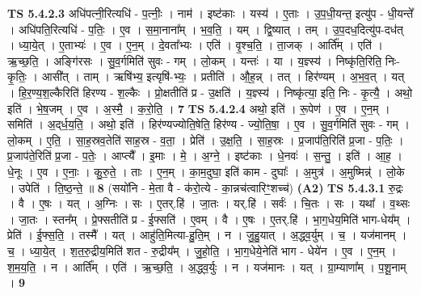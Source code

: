 \documentclass[17pt]{extarticle}
\begin{document}
                  \newline
                                \textbf{ TS 5.4.2.3} \newline
                  अधि॑पत्नी॒रित्यधि॑ - प॒त्नीः॒ । नाम॑ । इष्ट॑काः । यस्य॑ । ए॒ताः । उ॒प॒धी॒यन्त॒ इत्यु॑प - धी॒यन्ते᳚ । अधि॑पति॒रित्यधि॑ - प॒तिः॒ । ए॒व । स॒मा॒नाना᳚म् । भ॒व॒ति॒ । यम् । द्वि॒ष्यात् । तम् । उ॒प॒दध॒दित्यु॑प-दध॑त् । ध्या॒ये॒त् । ए॒ताभ्यः॑ । ए॒व । ए॒न॒म् । दे॒वता᳚भ्यः । एति॑ । वृ॒श्च॒ति॒ । ता॒जक् । आर्ति᳚म् । एति॑ । ऋ॒च्छ॒ति॒ । अङ्गि॑रसः । सु॒व॒र्गमिति॑ सुवः - गम् । लो॒कम् । यन्तः॑ । या । य॒ज्ञ्स्य॑ । निष्कृ॑ति॒रिति॒ निः-कृ॒तिः॒ । आसी᳚त् । ताम् । ऋषि॑भ्य॒ इत्यृषि॑-भ्यः॒ । प्रतीति॑ । औ॒ह॒न्न् । तत् । हिर॑ण्यम् । अ॒भ॒व॒त् । यत् । हि॒र॒ण्य॒श॒ल्कैरिति॑ हिरण्य - श॒ल्कैः । प्रो॒क्षतीति॑ प्र - उ॒क्षति॑ । य॒ज्ञ्स्य॑ । निष्कृ॑त्या॒ इति॒ निः - कृ॒त्यै॒ । अथो॒ इति॑ । भे॒ष॒जम् । ए॒व । अ॒स्मै॒ । क॒रो॒ति॒ । \textbf{  7} \newline
                  \newline
                                \textbf{ TS 5.4.2.4} \newline
                  अथो॒ इति॑ । रू॒पेण॑ । ए॒व । ए॒न॒म् । समिति॑ । अ॒द्‌र्ध॒य॒ति॒ । अथो॒ इति॑ । हिर॑ण्यज्योति॒षेति॒ हिर॑ण्य - ज्यो॒ति॒षा॒ । ए॒व । सु॒व॒र्गमिति॑ सुवः - गम् । लो॒कम् । ए॒ति॒ । सा॒ह॒स्रव॒तेति॑ साह॒स्र - व॒ता॒ । प्रेति॑ । उ॒क्ष॒ति॒ । सा॒ह॒स्रः । प्र॒जाप॑ति॒रिति॑ प्र॒जा - प॒तिः॒ । प्र॒जाप॑ते॒रिति॑ प्र॒जा - प॒तेः॒ । आप्त्यै᳚ । इ॒माः । मे॒ । अ॒ग्ने॒ । इष्ट॑काः । धे॒नवः॑ । स॒न्तु॒ । इति॑ । आ॒ह॒ । धे॒नूः । ए॒व । ए॒नाः॒ । कु॒रु॒ते॒ । ताः । ए॒न॒म् । का॒म॒दुघा॒ इति॑ काम - दुघाः᳚ । अ॒मुत्र॑ । अ॒मुष्मिन्न्॑ । लो॒के । उपेति॑ । ति॒ष्ठ॒न्ते॒ ॥ \textbf{  8} \newline
                  \newline
                      (सयो॑नि - मे॒ता वै - क॑रो॒त्ये - का॒न्नच॑त्वारिꣳ॒॒शच्च॑)  \textbf{(A2)} \newline \newline
                                \textbf{ TS 5.4.3.1} \newline
                  रु॒द्रः । वै । ए॒षः । यत् । अ॒ग्निः । सः । ए॒तर्.हि॑ । जा॒तः । यर्.हि॑ । सर्वः॑ । चि॒तः । सः । यथा᳚ । व॒थ्सः । जा॒तः । स्तन᳚म् । प्रे॒फ्सतीति॑ प्र - ई॒फ्सति॑ । ए॒वम् । वै । ए॒षः । ए॒तर्.हि॑ । भा॒ग॒धेय॒मिति॑ भाग-धेय᳚म् । प्रेति॑ । ई॒फ्स॒ति॒ । तस्मै᳚ । यत् । आहु॑ति॒मित्या-हु॒ति॒म् । न । जु॒हु॒यात् । अ॒द्ध्व॒र्युम् । च॒ । यज॑मानम् । च॒ । ध्या॒ये॒त् । श॒त॒रु॒द्रीय॒मिति॑ शत - रु॒द्रीय᳚म् । जु॒हो॒ति॒ । भा॒ग॒धेये॒नेति॑ भाग - धेये॑न । ए॒व । ए॒न॒म् । श॒म॒य॒ति॒ । न । आर्ति᳚म् । एति॑ । ऋ॒च्छ॒ति॒ । अ॒द्ध्व॒र्युः । न । यज॑मानः । यत् । ग्रा॒म्याणा᳚म् । प॒शू॒नाम् । \textbf{  9} \newline
\end{document}
